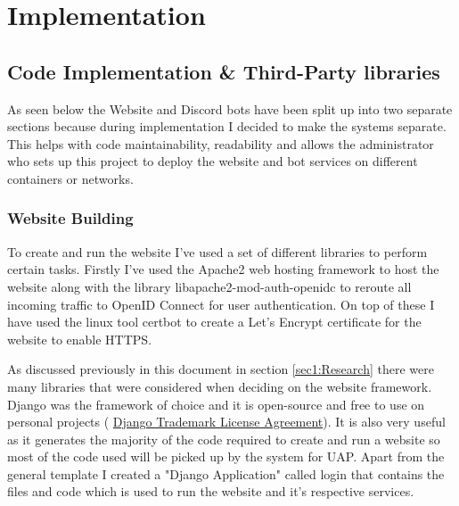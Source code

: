 \chapter{Implementation}

%
%

\section{Code Implementation \& Third-Party libraries}
As seen below the Website and Discord bots have been split up into two separate sections because during implementation I decided to make the systems separate. This helps with code maintainability, readability and allows the administrator who sets up this project to deploy the website and bot services on different containers or networks.

\subsection{Website Building}
To create and run the website I've used a set of different libraries to perform certain tasks. Firstly I've used the Apache2 \cite{apache2} web hosting framework to host the website along with the library libapache2-mod-auth-openidc to reroute all incoming traffic to OpenID Connect \cite{OpenID} for user authentication. On top of these I have used the linux tool certbot \cite{certbot} to create a Let's Encrypt certificate for the website to enable HTTPS. 

As discussed previously in this document in section \ref{sec1:Research} there were many libraries that were considered when deciding on the website framework. Django \cite{Django} was the framework of choice and it is open-source and free to use on personal projects ( \href{https://www.djangoproject.com/trademarks/\#:~:text=Django\%20is\%20an\%20Open\%20Source,the\%20use\%20of\%20a\%20trademark.}{Django Trademark License Agreement}). It is also very useful as it generates the majority of the code required to create and run a website so most of the code used will be picked up by the system for UAP. Apart from the general template I created a "Django Application" called login that contains the files and code which is used to run the website and it's respective services.

